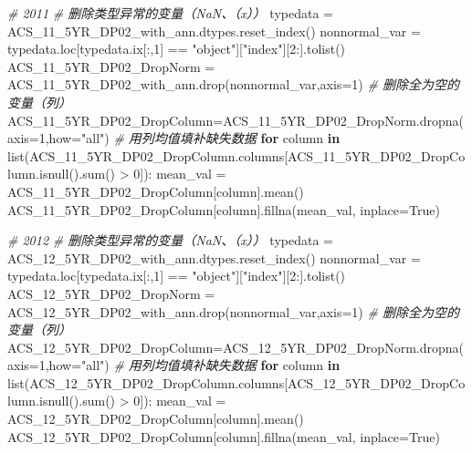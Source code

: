 \documentclass[
]{article}
\newenvironment{Shaded}{}{}
\newcommand{\BuiltInTok}[1]{#1}
\newcommand{\CommentTok}[1]{\textcolor[rgb]{0.38,0.63,0.69}{\textit{#1}}}
\newcommand{\ControlFlowTok}[1]{\textcolor[rgb]{0.00,0.44,0.13}{\textbf{#1}}}
\newcommand{\DecValTok}[1]{\textcolor[rgb]{0.25,0.63,0.44}{#1}}
\newcommand{\KeywordTok}[1]{\textcolor[rgb]{0.00,0.44,0.13}{\textbf{#1}}}
\newcommand{\NormalTok}[1]{#1}
\newcommand{\OperatorTok}[1]{\textcolor[rgb]{0.40,0.40,0.40}{#1}}
\newcommand{\StringTok}[1]{\textcolor[rgb]{0.25,0.44,0.63}{#1}}
\newcommand{\VariableTok}[1]{\textcolor[rgb]{0.10,0.09,0.49}{#1}}
\begin{document}
\begin{Shaded}
\begin{Highlighting}[]
\CommentTok{\# 2011}
\CommentTok{\# 删除类型异常的变量（NaN、（x））}
\NormalTok{typedata }\OperatorTok{=}\NormalTok{ ACS\_11\_5YR\_DP02\_with\_ann.dtypes.reset\_index()}
\NormalTok{nonnormal\_var }\OperatorTok{=}\NormalTok{ typedata.loc[typedata.ix[:,}\DecValTok{1}\NormalTok{] }\OperatorTok{==} \StringTok{"object"}\NormalTok{][}\StringTok{"index"}\NormalTok{][}\DecValTok{2}\NormalTok{:].tolist()}
\NormalTok{ACS\_11\_5YR\_DP02\_DropNorm }\OperatorTok{=}\NormalTok{ ACS\_11\_5YR\_DP02\_with\_ann.drop(nonnormal\_var,axis}\OperatorTok{=}\DecValTok{1}\NormalTok{)}
\CommentTok{\# 删除全为空的变量（列）}
\NormalTok{ACS\_11\_5YR\_DP02\_DropColumn}\OperatorTok{=}\NormalTok{ACS\_11\_5YR\_DP02\_DropNorm.dropna(axis}\OperatorTok{=}\DecValTok{1}\NormalTok{,how}\OperatorTok{=}\StringTok{"all"}\NormalTok{)}
\CommentTok{\# 用列均值填补缺失数据}
\ControlFlowTok{for}\NormalTok{ column }\KeywordTok{in} \BuiltInTok{list}\NormalTok{(ACS\_11\_5YR\_DP02\_DropColumn.columns[ACS\_11\_5YR\_DP02\_DropColumn.isnull().}\BuiltInTok{sum}\NormalTok{() }\OperatorTok{\textgreater{}} \DecValTok{0}\NormalTok{]):}
\NormalTok{    mean\_val }\OperatorTok{=}\NormalTok{ ACS\_11\_5YR\_DP02\_DropColumn[column].mean()}
\NormalTok{    ACS\_11\_5YR\_DP02\_DropColumn[column].fillna(mean\_val, inplace}\OperatorTok{=}\VariableTok{True}\NormalTok{)}

\CommentTok{\# 2012}
\CommentTok{\# 删除类型异常的变量（NaN、（x））}
\NormalTok{typedata }\OperatorTok{=}\NormalTok{ ACS\_12\_5YR\_DP02\_with\_ann.dtypes.reset\_index()}
\NormalTok{nonnormal\_var }\OperatorTok{=}\NormalTok{ typedata.loc[typedata.ix[:,}\DecValTok{1}\NormalTok{] }\OperatorTok{==} \StringTok{"object"}\NormalTok{][}\StringTok{"index"}\NormalTok{][}\DecValTok{2}\NormalTok{:].tolist()}
\NormalTok{ACS\_12\_5YR\_DP02\_DropNorm }\OperatorTok{=}\NormalTok{ ACS\_12\_5YR\_DP02\_with\_ann.drop(nonnormal\_var,axis}\OperatorTok{=}\DecValTok{1}\NormalTok{)}
\CommentTok{\# 删除全为空的变量（列）}
\NormalTok{ACS\_12\_5YR\_DP02\_DropColumn}\OperatorTok{=}\NormalTok{ACS\_12\_5YR\_DP02\_DropNorm.dropna(axis}\OperatorTok{=}\DecValTok{1}\NormalTok{,how}\OperatorTok{=}\StringTok{"all"}\NormalTok{)}
\CommentTok{\# 用列均值填补缺失数据}
\ControlFlowTok{for}\NormalTok{ column }\KeywordTok{in} \BuiltInTok{list}\NormalTok{(ACS\_12\_5YR\_DP02\_DropColumn.columns[ACS\_12\_5YR\_DP02\_DropColumn.isnull().}\BuiltInTok{sum}\NormalTok{() }\OperatorTok{\textgreater{}} \DecValTok{0}\NormalTok{]):}
\NormalTok{    mean\_val }\OperatorTok{=}\NormalTok{ ACS\_12\_5YR\_DP02\_DropColumn[column].mean()}
\NormalTok{    ACS\_12\_5YR\_DP02\_DropColumn[column].fillna(mean\_val, inplace}\OperatorTok{=}\VariableTok{True}\NormalTok{)}


\end{Highlighting}
\end{Shaded}
\end{document}
